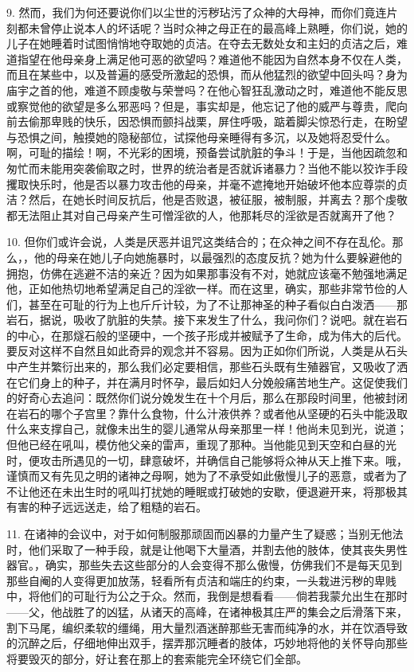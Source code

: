 9. 然而，我们为何还要说你们以尘世的污秽玷污了众神的大母神，而你们竟连片刻都未曾停止说本人的坏话呢？当时众神之母正在的最高峰上熟睡，你们说，她的儿子在她睡着时试图悄悄地夺取她的贞洁。在夺去无数处女和主妇的贞洁之后，难道指望在他母亲身上满足他可恶的欲望吗？难道他不能因为自然本身不仅在人类，而且在某些中，以及普遍的感受所激起的恐惧，而从他猛烈的欲望中回头吗？身为庙宇之首的他，难道不顾虔敬与荣誉吗？在他心智狂乱激动之时，难道他不能反思或察觉他的欲望是多么邪恶吗？但是，事实却是，他忘记了他的威严与尊贵，爬向前去偷那卑贱的快乐，因恐惧而颤抖战栗，屏住呼吸，踮着脚尖惊恐行走，在盼望与恐惧之间，触摸她的隐秘部位，试探他母亲睡得有多沉，以及她将忍受什么。啊，可耻的描绘！啊，不光彩的困境，预备尝试肮脏的争斗！于是，当他因疏忽和匆忙而未能用突袭偷取之时，世界的统治者是否就诉诸暴力？当他不能以狡诈手段攫取快乐时，他是否以暴力攻击他的母亲，并毫不遮掩地开始破坏他本应尊崇的贞洁？然后，在她长时间反抗后，他是否败退，被征服，被制服，并离去？那个虔敬都无法阻止其对自己母亲产生可憎淫欲的人，他那耗尽的淫欲是否就离开了他？\par

10. 但你们或许会说，人类是厌恶并诅咒这类结合的；在众神之间不存在乱伦。那么，，他的母亲在她儿子向她施暴时，以最强烈的态度反抗？她为什么要躲避他的拥抱，仿佛在逃避不洁的亲近？因为如果那事没有不对，她就应该毫不勉强地满足他，正如他热切地希望满足自己的淫欲一样。而在这里，确实，那些非常节俭的人们，甚至在可耻的行为上也斤斤计较，为了不让那神圣的种子看似白白泼洒——那岩石，据说，吸收了肮脏的失禁。接下来发生了什么，我问你们？说吧。就在岩石的中心，在那燧石般的坚硬中，一个孩子形成并被赋予了生命，成为伟大的后代。要反对这样不自然且如此奇异的观念并不容易。因为正如你们所说，人类是从石头中产生并繁衍出来的，那么我们必定要相信，那些石头既有生殖器官，又吸收了洒在它们身上的种子，并在满月时怀孕，最后如妇人分娩般痛苦地生产。这促使我们的好奇心去追问：既然你们说分娩发生在十个月后，那么在那段时间里，他被封闭在岩石的哪个子宫里？靠什么食物，什么汁液供养？或者他从坚硬的石头中能汲取什么来支撑自己，就像未出生的婴儿通常从母亲那里一样！他尚未见到光，说道；但他已经在吼叫，模仿他父亲的雷声，重现了那种。当他能见到天空和白昼的光时，便攻击所遇见的一切，肆意破坏，并确信自己能够将众神从天上推下来。哦，谨慎而又有先见之明的诸神之母啊，她为了不承受如此傲慢儿子的恶意，或者为了不让他还在未出生时的吼叫打扰她的睡眠或打破她的安歇，便退避开来，将那极其有害的种子远远送走，给了粗糙的岩石。\par

11. 在诸神的会议中，对于如何制服那顽固而凶暴的力量产生了疑惑；当别无他法时，他们采取了一种手段，就是让他喝下大量酒，并割去他的肢体，使其丧失男性器官。，确实，那些失去这些部分的人会变得不那么傲慢，仿佛我们不是每天见到那些自阉的人变得更加放荡，轻看所有贞洁和端庄的约束，一头栽进污秽的卑贱中，将他们的可耻行为公之于众。然而，我倒是想看看——倘若我蒙允出生在那时——父，他战胜了的凶猛，从诸天的高峰，在诸神极其庄严的集会之后滑落下来，割下马尾，编织柔软的缰绳，用大量烈酒迷醉那些无害而纯净的水，并在饮酒导致的沉醉之后，仔细地伸出双手，摆弄那沉睡者的肢体，巧妙地将他的关怀导向那些将要毁灭的部分，好让套在那上的套索能完全环绕它们全部。\par

